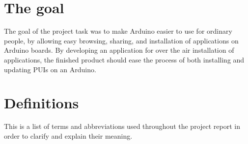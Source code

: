 \section{The goal}
The goal of the project task was to make Arduino easier to use for ordinary people, by allowing easy browsing, sharing, and installation of applications on Arduino boards. By developing an application for over the air installation of applications, the finished product should ease the process of both installing and updating PUIs on an Arduino.

\section{Definitions}
This is a list of terms and abbreviations used throughout the project report in order to clarify and explain their meaning.

